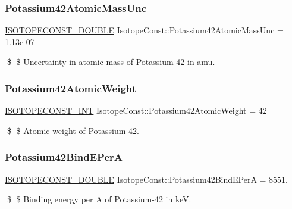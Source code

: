 \subsubsection{\texorpdfstring{Potassium42\+Atomic\+Mass\+Unc}{Potassium42AtomicMassUnc}}
{\footnotesize\ttfamily \mbox{\hyperlink{group___isotope_const-_macros_ga8f45a7272ce02c0b4c65c44636ed719a}{I\+S\+O\+T\+O\+P\+E\+C\+O\+N\+S\+T\+\_\+\+D\+O\+U\+B\+LE}} Isotope\+Const\+::\+Potassium42\+Atomic\+Mass\+Unc = 1.\+13e-\/07}

\$ \$ Uncertainty in atomic mass of Potassium-\/42 in amu. \mbox{\label{group___isotope_const-_potassium-_k42_ga0a6fc647d3e1ee7967caa55b60d3f41f}} 
\subsubsection{\texorpdfstring{Potassium42\+Atomic\+Weight}{Potassium42AtomicWeight}}
{\footnotesize\ttfamily \mbox{\hyperlink{group___isotope_const-_macros_ga5f18360b3e99483a35c32d789e62621c}{I\+S\+O\+T\+O\+P\+E\+C\+O\+N\+S\+T\+\_\+\+I\+NT}} Isotope\+Const\+::\+Potassium42\+Atomic\+Weight = 42}

\$ \$ Atomic weight of Potassium-\/42. \mbox{\label{group___isotope_const-_potassium-_k42_ga509b9b12903ff6a26b1d2797a327ca73}} 
\subsubsection{\texorpdfstring{Potassium42\+Bind\+E\+PerA}{Potassium42BindEPerA}}
{\footnotesize\ttfamily \mbox{\hyperlink{group___isotope_const-_macros_ga8f45a7272ce02c0b4c65c44636ed719a}{I\+S\+O\+T\+O\+P\+E\+C\+O\+N\+S\+T\+\_\+\+D\+O\+U\+B\+LE}} Isotope\+Const\+::\+Potassium42\+Bind\+E\+PerA = 8551.}

\$ \$ Binding energy per A of Potassium-\/42 in keV. \mbox{\label{group___isotope_const-_potassium-_k42_gae78c2497626c29758345b726d4338031}} 
